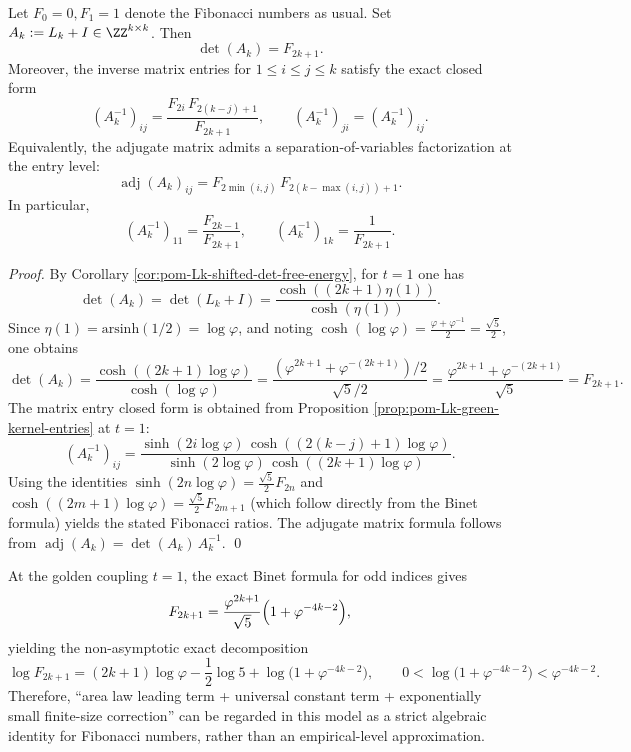 \begin{corollary}\label{cor:pom-Lk-t1-fibonacci-det-green}
Let \(F_0=0,F_1=1\) denote the Fibonacci numbers as usual. Set \(A_k:=L_k+I\in\ZZ^{k\times k}\).
Then
\[
\det(A_k)=F_{2k+1}.
\]
Moreover, the inverse matrix entries for \(1\le i\le j\le k\) satisfy the exact closed form
\[
(A_k^{-1})_{ij}
=\frac{F_{2i}\,F_{2(k-j)+1}}{F_{2k+1}},
\qquad
(A_k^{-1})_{ji}=(A_k^{-1})_{ij}.
\]
Equivalently, the adjugate matrix admits a separation-of-variables factorization at the entry level:
\[
\operatorname{adj}(A_k)_{ij}=F_{2\min(i,j)}\,F_{2(k-\max(i,j))+1}.
\]
In particular,
\[
(A_k^{-1})_{11}=\frac{F_{2k-1}}{F_{2k+1}},
\qquad
(A_k^{-1})_{1k}=\frac{1}{F_{2k+1}}.
\]
\end{corollary}
\begin{proof}
By Corollary \ref{cor:pom-Lk-shifted-det-free-energy}, for \(t=1\) one has
\[
\det(A_k)=\det(L_k+I)=\frac{\cosh((2k+1)\eta(1))}{\cosh(\eta(1))}.
\]
Since \(\eta(1)=\mathrm{arsinh}(1/2)=\log\varphi\), and noting \(\cosh(\log\varphi)=\frac{\varphi+\varphi^{-1}}{2}=\frac{\sqrt5}{2}\),
one obtains
\[
\det(A_k)=\frac{\cosh((2k+1)\log\varphi)}{\cosh(\log\varphi)}
=\frac{(\varphi^{2k+1}+\varphi^{-(2k+1)})/2}{\sqrt5/2}
=\frac{\varphi^{2k+1}+\varphi^{-(2k+1)}}{\sqrt5}
=F_{2k+1}.
\]
The matrix entry closed form is obtained from Proposition \ref{prop:pom-Lk-green-kernel-entries} at \(t=1\):
\[
(A_k^{-1})_{ij}
=\frac{\sinh(2i\log\varphi)\,\cosh((2(k-j)+1)\log\varphi)}{\sinh(2\log\varphi)\,\cosh((2k+1)\log\varphi)}.
\]
Using the identities
\(
\sinh(2n\log\varphi)=\frac{\sqrt5}{2}F_{2n}
\)
and
\(
\cosh((2m+1)\log\varphi)=\frac{\sqrt5}{2}F_{2m+1}
\)
(which follow directly from the Binet formula) yields the stated Fibonacci ratios.
The adjugate matrix formula follows from \(\operatorname{adj}(A_k)=\det(A_k)\,A_k^{-1}\). \qed
\end{proof}

\begin{remark}\label{rem:pom-Lk-fibonacci-area-law-exact}
At the golden coupling \(t=1\), the exact Binet formula for odd indices gives
\[
F_{2k+1}=\frac{\varphi^{2k+1}}{\sqrt5}\Bigl(1+\varphi^{-4k-2}\Bigr),
\]
yielding the non-asymptotic exact decomposition
\[
\log F_{2k+1}=(2k+1)\log\varphi-\frac12\log 5+\log\bigl(1+\varphi^{-4k-2}\bigr),
\qquad
0<\log\bigl(1+\varphi^{-4k-2}\bigr)<\varphi^{-4k-2}.
\]
Therefore, ``area law leading term + universal constant term + exponentially small finite-size correction'' can be regarded in this model as a strict algebraic identity for Fibonacci numbers, rather than an empirical-level approximation.
\end{remark}

